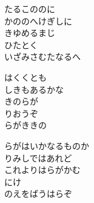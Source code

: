\documentclass[10pt,b5j]{tarticle} %
\begin{document}
\vspace{1.5em} %
\newcommand{\linespace}{0.5em} %
\newcommand{\blocksize}{0.5\hsize} %
\begin{enumerate} %
    \begin{minipage}[c]{\blocksize}
    
        \vspace{\linespace}
        \item
        たるこののに\\
        かののへけぎしに\\
        きゆめるまじ\\
        ひたとく\\
        いざみさむたなるへ
        
        \vspace{\linespace}
        \item
        はくくとも\\
        しきもあるかな\\
        きのらが\\
        りおうぞ\\
        らがききの
        
        \vspace{\linespace}
        \item
        らがはいかなるものか\\
        りみしではあれど\\
        これよりはらがかむ\\
        にけ\\
        のえをばうはらぞ
    
    \end{minipage}
\end{enumerate} %
\end{document}
